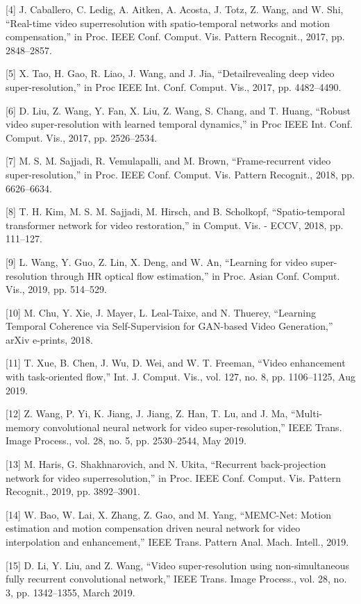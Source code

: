 \documentclass[11pt,UTF8]{ctexart}
\begin{document}
[4] J. Caballero, C. Ledig, A. Aitken, A. Acosta, J. Totz, Z. Wang, and W. Shi, “Real-time video superresolution with spatio-temporal networks and motion compensation,” in Proc. IEEE Conf. Comput. Vis. Pattern Recognit., 2017, pp. 2848–2857.

[5] X. Tao, H. Gao, R. Liao, J. Wang, and J. Jia, “Detailrevealing deep video super-resolution,” in Proc IEEE Int. Conf. Comput. Vis., 2017, pp. 4482–4490.

[6] D. Liu, Z. Wang, Y. Fan, X. Liu, Z. Wang, S. Chang, and T. Huang, “Robust video super-resolution with learned temporal dynamics,” in Proc IEEE Int. Conf. Comput. Vis., 2017, pp. 2526–2534.

[7] M. S. M. Sajjadi, R. Vemulapalli, and M. Brown, “Frame-recurrent video super-resolution,” in Proc. IEEE Conf. Comput. Vis. Pattern Recognit., 2018, pp. 6626–6634.

[8] T. H. Kim, M. S. M. Sajjadi, M. Hirsch, and B. Scholkopf, “Spatio-temporal transformer network for video restoration,” in Comput. Vis. - ECCV, 2018, pp. 111–127.

[9] L. Wang, Y. Guo, Z. Lin, X. Deng, and W. An, “Learning for video super-resolution through HR optical flow estimation,” in Proc. Asian Conf. Comput. Vis., 2019, pp. 514–529.

[10] M. Chu, Y. Xie, J. Mayer, L. Leal-Taixe, and N. Thuerey, “Learning Temporal Coherence via Self-Supervision for GAN-based Video Generation,” arXiv e-prints, 2018.

[11] T. Xue, B. Chen, J. Wu, D. Wei, and W. T. Freeman, “Video enhancement with task-oriented flow,” Int. J. Comput. Vis., vol. 127, no. 8, pp. 1106–1125, Aug 2019.

[12] Z. Wang, P. Yi, K. Jiang, J. Jiang, Z. Han, T. Lu, and J. Ma, “Multi-memory convolutional neural network for video super-resolution,” IEEE Trans. Image Process., vol. 28, no. 5, pp. 2530–2544, May 2019.

[13] M. Haris, G. Shakhnarovich, and N. Ukita, “Recurrent back-projection network for video superresolution,” in Proc. IEEE Conf. Comput. Vis. Pattern Recognit., 2019, pp. 3892–3901.

[14] W. Bao, W. Lai, X. Zhang, Z. Gao, and M. Yang, “MEMC-Net: Motion estimation and motion compensation driven neural network for video interpolation and enhancement,” IEEE Trans. Pattern Anal. Mach. Intell., 2019.

[15] D. Li, Y. Liu, and Z. Wang, “Video super-resolution using non-simultaneous fully recurrent convolutional network,” IEEE Trans. Image Process., vol. 28, no. 3, pp. 1342–1355, March 2019.
\end{document}
